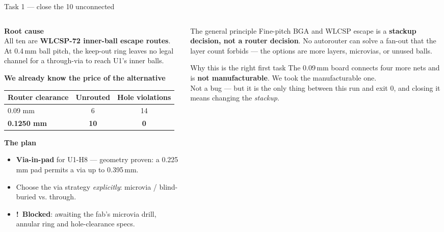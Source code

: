 \documentclass[aspectratio=169,10pt]{beamer}
\newcommand{\gap}{{\color{stamber}\textbf{!}}}
\newcommand{\code}[1]{{\ttfamily\small #1}}
\begin{document}
\begin{frame}{Task 1 --- close the 10 unconnected}
\vspace{-2mm}
\begin{columns}[T]
\begin{column}{0.52\textwidth}
\textbf{Root cause}\\[2pt]
\small All ten are \textbf{WLCSP-72 inner-ball escape routes}. At 0.4\,mm ball pitch, the keep-out ring leaves no legal channel for a through-via to reach U1's inner balls.
\vspace{1mm}

\textbf{We already know the price of the alternative}
\begin{center}\scriptsize
\begin{tabular}{@{}l c c@{}}
\toprule
\textbf{Router clearance} & \textbf{Unrouted} & \textbf{Hole violations}\\
\midrule
0.09 mm & 6 & \alert{14}\\
\textbf{0.1250 mm} & \textbf{10} & \textbf{0}\\
\bottomrule
\end{tabular}
\end{center}
\vspace{1mm}

\textbf{The plan}
\begin{itemize}\small
  \item \textbf{Via-in-pad} for \code{U1-H8} --- geometry proven: a 0.225\,mm pad permits a via up to 0.395\,mm.
  \item Choose the via strategy \emph{explicitly}: microvia / blind-buried vs. through.
  \item \gap\ \textbf{Blocked}: awaiting the fab's microvia drill, annular ring and hole-clearance specs.
\end{itemize}
\end{column}
\begin{column}{0.45\textwidth}
\begin{block}{The general principle}
\small
Fine-pitch BGA and WLCSP escape is a \textbf{stackup decision, not a router decision}. No autorouter can solve a fan-out that the layer count forbids --- the options are more layers, microvias, or unused balls.
\end{block}
\vspace{1mm}
\begin{block}{Why this is the right first task}
\small
The 0.09\,mm board connects four more nets and is \textbf{not manufacturable}. We took the manufacturable one.\\[3pt]
Not a bug --- but it is the only thing between this run and \code{exit 0}, and closing it means changing the \emph{stackup}.
\end{block}
\end{column}
\end{columns}
\end{frame}
\end{document}

